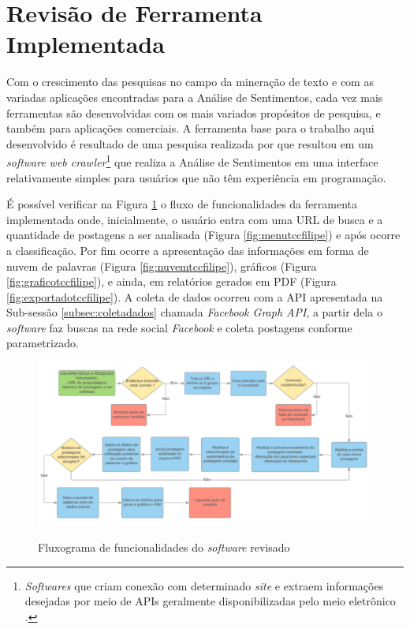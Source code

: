 \section{Revisão de Ferramenta Implementada}
\label{sec:revisaoferramenta}
Com o crescimento das pesquisas no campo da mineração de texto e com as variadas aplicações encontradas para a Análise de Sentimentos, cada vez mais ferramentas são desenvolvidas com os mais variados propósitos de pesquisa, e também para aplicações comerciais. A ferramenta base para o trabalho aqui desenvolvido é resultado de uma pesquisa realizada por  que resultou em um \textit{software} \textit{web crawler}\footnote{ \textit{Softwares} que criam conexão com determinado \textit{site} e extraem informações desejadas por meio de APIs geralmente disponibilizadas pelo meio eletrônico \cite{Kumar2018}.} que realiza a Análise de Sentimentos em uma interface relativamente simples para usuários que não têm experiência em programação.

É possível verificar na Figura \ref{fig:fluxotccfilipe} o fluxo de funcionalidades da ferramenta implementada onde, inicialmente, o usuário entra com uma URL de busca e a quantidade de postagens a ser analisada (Figura \ref{fig:menutccfilipe}) e após ocorre a classificação. Por fim ocorre a apresentação das informações em forma de nuvem de palavras (Figura \ref{fig:nuvemtccfilipe}), gráficos (Figura \ref{fig:graficotccfilipe}), e ainda, em relatórios gerados em PDF (Figura \ref{fig:exportadotccfilipe}). A coleta de dados ocorreu com a API apresentada na Sub-sessão \ref{subsec:coletadados} chamada \textit{Facebook Graph API}, a partir dela o \textit{software} faz buscas na rede social \textit{Facebook} e coleta postagens conforme parametrizado.

\newpage

\begin{figure}[!h]
\centering 
\caption{Fluxograma de funcionalidades do \textit{software} revisado}
\includegraphics[scale=0.40]{imagens/fluxofilipe.png}
\label{fig:fluxotccfilipe}
\end{figure}

